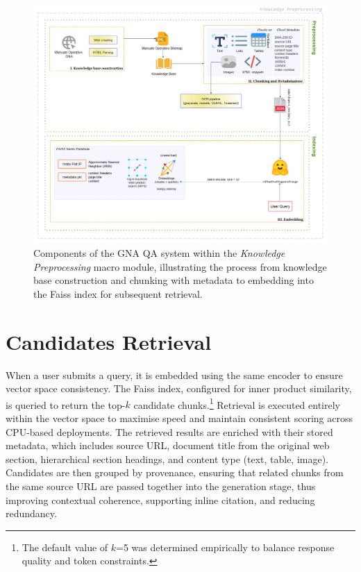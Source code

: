 \begin{spacing}{1.5}
\begin{figure}[H]
  \centering
  \includegraphics[width=\textwidth]{images/preprocess_diagram.png} 
  \caption{Components of the GNA QA system within the \textit{Knowledge Preprocessing} macro module, illustrating the process from knowledge base construction and chunking with metadata to embedding into the Faiss index for subsequent retrieval.}
  \label{fig:pre}
\end{figure}

\section{Candidates Retrieval}
When a user submits a query, it is embedded using the same encoder to ensure vector space consistency. The Faiss index, configured for inner product similarity, is queried to return the top-$k$ candidate chunks.\footnote{The default value of $k$=5 was determined empirically to balance response quality and token constraints.} Retrieval is executed entirely within the vector space to maximise speed and maintain consistent scoring across CPU-based deployments. The retrieved results are enriched with their stored metadata, which includes source URL, document title from the original web section, hierarchical section headings, and content type (text, table, image). Candidates are then grouped by provenance, ensuring that related chunks from the same source URL are passed together into the generation stage, thus improving contextual coherence, supporting inline citation, and reducing redundancy.


\end{spacing}
